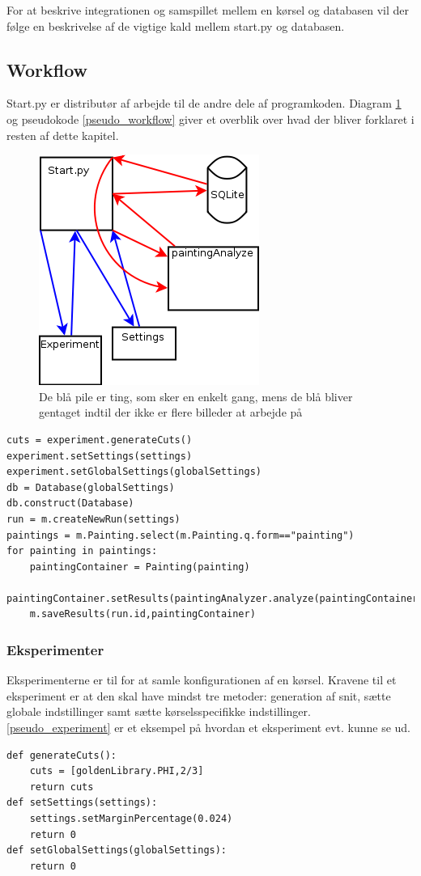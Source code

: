 {
For at beskrive integrationen og samspillet mellem en kørsel og
databasen vil der følge en beskrivelse af de vigtige kald mellem 
start.py og databasen. 
\subsection{Workflow}
Start.py er distributør af arbejde til de andre dele af programkoden.
Diagram \ref{start_workflow} og pseudokode \ref{pseudo_workflow} giver et overblik over hvad der bliver
forklaret i resten af dette kapitel. 
\begin{figure}[h!]
	\begin{center}
		\includegraphics[scale=0.5]{afsnit/implementation/billeder/workflow_start_py.png}
	\end{center}
	\caption{De blå pile er ting, som sker en enkelt gang, mens de blå
	\label{start_workflow}
	bliver gentaget indtil der ikke er flere billeder at arbejde på}
\end{figure}
\begin{lstlisting}[caption={Pseudokode for
start},frame=tb,label={pseudo_workflow}]
cuts = experiment.generateCuts()
experiment.setSettings(settings)
experiment.setGlobalSettings(globalSettings)
db = Database(globalSettings)
db.construct(Database)
run = m.createNewRun(settings)
paintings = m.Painting.select(m.Painting.q.form=="painting")
for painting in paintings:
	paintingContainer = Painting(painting)
	paintingContainer.setResults(paintingAnalyzer.analyze(paintingContainer,settings))
	m.saveResults(run.id,paintingContainer)
\end{lstlisting}
\subsubsection{Eksperimenter}
Eksperimenterne er til for at samle konfigurationen af en kørsel.
Kravene til et eksperiment er at den skal have mindst tre metoder:
generation af snit, sætte globale indstillinger samt sætte
kørselsspecifikke indstillinger. \ref{pseudo_experiment} er et eksempel
på hvordan et eksperiment evt. kunne se ud.
\begin{lstlisting}[caption={Pseudokode for et
experiment, som checker på $\varPhi$},frame=tb,label={pseudo_experiment}]
def generateCuts():
	cuts = [goldenLibrary.PHI,2/3]
	return cuts
def setSettings(settings):
	settings.setMarginPercentage(0.024)
	return 0
def setGlobalSettings(globalSettings):
	return 0
\end{lstlisting}
}
